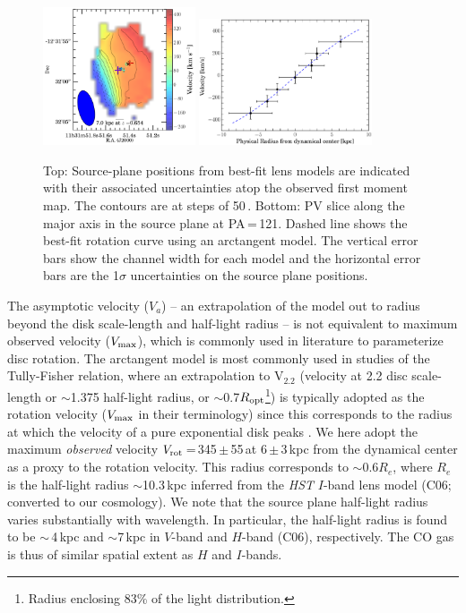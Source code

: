 \documentclass[]{emulateapj}
\begin{document}
\begin{figure}[!htbp]
\centering
\includegraphics[width=0.4\textwidth]{../Figures/veloGradient_markers}
\includegraphics[width=0.455\textwidth]{../Figures/bestfit_PV.eps}
\caption{Top: Source-plane positions from best-fit \bco lens models are indicated with their associated uncertainties atop
the observed first moment map. The contours are at steps of 50\,\kms.
Bottom: PV slice along the major axis in the source plane at PA\,=\,121\degr.
Dashed line shows the best-fit rotation curve using an arctangent model.
The vertical error bars show the channel width for
each model and the horizontal error bars are the
1$\sigma$ uncertainties on the source plane positions.
 \label{fig:PV}}
\end{figure}

The asymptotic velocity ($V_{a}$) -- an extrapolation of the model
out to radius beyond the disk scale-length and half-light radius --
is not equivalent to maximum observed velocity ($V_{\rm max}$),
which is commonly used in literature to parameterize disc rotation.
The arctangent model is most commonly used in studies of the
Tully-Fisher relation, where an extrapolation to V$_{2.2}$ (velocity
at 2.2 disc scale-length or $\sim$1.375 half-light radius,
or $\sim$0.7$R_{\rm opt}$\footnote{Radius enclosing 83\% of the light
distribution.}) is typically adopted
as the rotation velocity ($V_{\rm max}$ in their
terminology) since this corresponds to the radius at which the velocity
of a pure exponential disk peaks \citep{Courteau97b}.
We here adopt the maximum {\em observed} velocity
$V_{\rm rot}$\,=\,345\,$\pm$\,55\,\kms at 6\,$\pm$\,3\,kpc from the %
dynamical center as a proxy to the rotation velocity.
This radius corresponds to $\sim$0.6$R_e$, where $R_e$ is the half-light
radius $\sim$10.3\,kpc inferred from the {\it HST} $I$-band
lens model (C06; converted to
our cosmology).
We note that the source plane half-light radius varies substantially with
wavelength. In particular, the half-light radius is found to be
$\sim$\,4\,kpc and $\sim$7\,kpc in $V$-band
\citep{Brewer08a} and $H$-band (C06), respectively.
The CO gas is thus of similar spatial
extent as $H$ and $I$-bands. 
\end{document}
